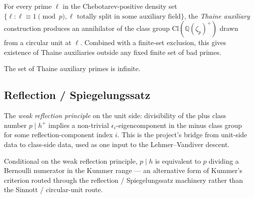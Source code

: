 \begin{theorem}
  \label{thm:thaineAuxiliaryExistence_of_prime}
  \leanok
  For every prime $\ell$ in the Chebotarev-positive density set
  $\{\ell : \ell \equiv 1 \pmod p, \ell \text{ totally split in some
  auxiliary field}\}$, the \emph{Thaine auxiliary} construction
  produces an annihilator of the class group $\mathrm{Cl}(\mathbb Q(\zeta_p)^+)$
  drawn from a circular unit at $\ell$.  Combined with a finite-set
  exclusion, this gives existence of Thaine auxiliaries outside any
  fixed finite set of bad primes.
\end{theorem}

\begin{theorem}
  \label{thm:infinite_setOf_thaineAuxiliary}
  \leanok
  The set of Thaine auxiliary primes is infinite.
\end{theorem}

\subsection*{Reflection / Spiegelungssatz}

\begin{theorem}
  \label{thm:weakReflection_dvd_hMinus_of_dvd_hPlus_units}
  \leanok
  The \emph{weak reflection principle} on the unit side: divisibility
  of the plus class number $p \mid h^+$ implies a non-trivial
  $\epsilon_i$-eigencomponent in the minus class group for some
  reflection-component index $i$.  This is the project's bridge from
  unit-side data to class-side data, used as one input to the
  Lehmer--Vandiver descent.
\end{theorem}

\begin{theorem}
  \label{thm:dvd_h_iff_exists_dvd_bernoulli_of_weakReflection}
  \leanok
  Conditional on the weak reflection principle, $p \mid h$ is
  equivalent to $p$ dividing a Bernoulli numerator in the
  Kummer range — an alternative form of Kummer's criterion routed
  through the reflection / Spiegelungssatz machinery rather than the
  Sinnott / circular-unit route.
\end{theorem}

